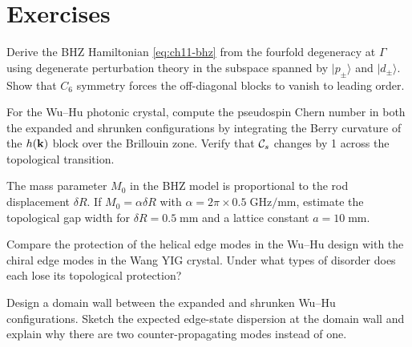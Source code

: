 \section*{Exercises}

\begin{exercise}
  Derive the BHZ Hamiltonian \eqref{eq:ch11-bhz} from the fourfold
  degeneracy at $\Gamma$ using degenerate perturbation theory in the
  subspace spanned by $|p_\pm\rangle$ and $|d_\pm\rangle$.  Show that
  $C_6$ symmetry forces the off-diagonal blocks to vanish to leading
  order.
\end{exercise}

\begin{exercise}
  For the Wu--Hu photonic crystal, compute the pseudospin Chern number
  in both the expanded and shrunken configurations by integrating the
  Berry curvature of the $h(\mathbf{k})$ block over the Brillouin zone.
  Verify that $\mathcal{C}_s$ changes by 1 across the topological transition.
\end{exercise}

\begin{exercise}
  The mass parameter $M_0$ in the BHZ model is proportional to the
  rod displacement $\delta R$.  If $M_0=\alpha\delta R$ with
  $\alpha=2\pi\times 0.5\;\mathrm{GHz/mm}$, estimate the topological
  gap width for $\delta R=0.5\;\mathrm{mm}$ and a lattice constant
  $a=10\;\mathrm{mm}$.
\end{exercise}

\begin{exercise}
  Compare the protection of the helical edge modes in the Wu--Hu
  design with the chiral edge modes in the Wang YIG crystal.  Under
  what types of disorder does each lose its topological protection?
\end{exercise}

\begin{exercise}
  Design a domain wall between the expanded and shrunken Wu--Hu
  configurations.  Sketch the expected edge-state dispersion at the
  domain wall and explain why there are two counter-propagating
  modes instead of one.
\end{exercise}
